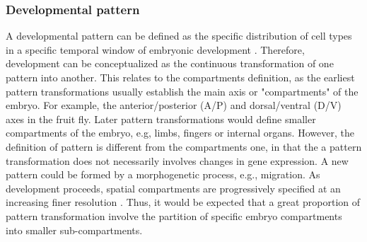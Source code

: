 \subsubsection{Developmental pattern}
A developmental pattern can be defined as the specific distribution of cell types in a specific temporal window of embryonic development \citep{Salazar-Ciudad2004}. 
Therefore, development can be conceptualized as the continuous transformation of one pattern into another.
This relates to the compartments definition, as the earliest pattern transformations usually establish the main axis or "compartments" of the embryo. For example, the anterior/posterior (A/P) and dorsal/ventral (D/V) axes in the fruit fly.
Later pattern transformations would define smaller compartments of the embryo, e.g, limbs, fingers  or internal organs.
However, the definition of pattern is different from the compartments one, in that the a pattern transformation does not necessarily involves changes in gene expression. A new pattern could be formed by a morphogenetic process, e.g., migration.
\hfill \break
As development proceeds, spatial compartments are progressively specified at an increasing finer resolution \citep{Davidson2001}.
Thus, it would be expected that a great proportion of pattern transformation involve the partition of specific embryo compartments into smaller sub-compartments.
%


%
%


